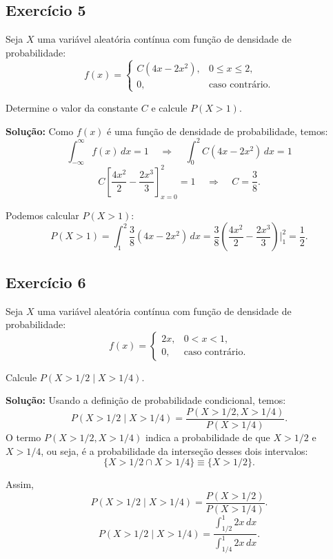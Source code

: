 \documentclass{article}
\begin{document}
\subsection{Exercício 5}
Seja $X$ uma variável aleatória contínua com função de densidade de probabilidade:
    $$
    f(x) = 
    \begin{cases}
    C(4x - 2x^2), & 0 \leq x \leq 2, \\
    0, & \text{caso contrário}.
    \end{cases}
    $$

Determine o valor da constante $C$ e calcule $P(X > 1)$.

\vspace{0.5cm}
\textbf{Solução:} Como $f(x)$ é uma função de densidade de probabilidade, temos:
    $$
    \int_{-\infty}^{\infty} f(x) \, dx = 1 \;\;\;\; \Longrightarrow \;\;\;\; \int_{0}^{2} C(4x - 2x^2)\, dx = 1
    $$
    $$
    C \left[ \frac{4x^2}{2} - \frac{2x^3}{3} \right]_{x=0}^{2} = 1 \;\;\;\; \Longrightarrow \;\;\;\; C = \frac{3}{8}.
    $$

Podemos calcular $P(X > 1)$:
    $$
    P(X > 1) = \int_{1}^{2} \frac{3}{8}(4x - 2x^2)\, dx 
    = \frac{3}{8} \left( \frac{4x^2}{2} - \frac{2x^3}{3} \right)\Big|_{1}^{2}
    = \frac{1}{2}.
    $$

\subsection{Exercício 6}
Seja $X$ uma variável aleatória contínua com função de densidade de probabilidade:
    $$
    f(x) = 
    \begin{cases} 
    2x, & 0 < x < 1, \\[6pt]
    0, & \text{caso contrário}.
    \end{cases}
    $$

Calcule $P(X > 1/2 \mid X > 1/4)$.

\vspace{0.5cm}
\textbf{Solução:} Usando a definição de probabilidade condicional, temos:
    $$
    P(X > 1/2 \mid X > 1/4) = \frac{P(X > 1/2, X > 1/4)}{P(X > 1/4)}.
    $$
O termo $P(X > 1/2, X > 1/4)$ indica a probabilidade de que $X > 1/2$ e $X > 1/4$, ou seja, é a probabilidade da interseção desses dois intervalos:
    $$
    \{X > 1/2 \cap X > 1/4\} \equiv \{X > 1/2\}.
    $$

Assim,
    $$
    P(X > 1/2 \mid X > 1/4) = \frac{P(X > 1/2)}{P(X > 1/4)}.
    $$  
    $$
    P(X > 1/2 \mid X > 1/4) = \frac{\int_{1/2}^{1} 2x \, dx}{\int_{1/4}^{1} 2x \, dx}.
    $$
\end{document}
